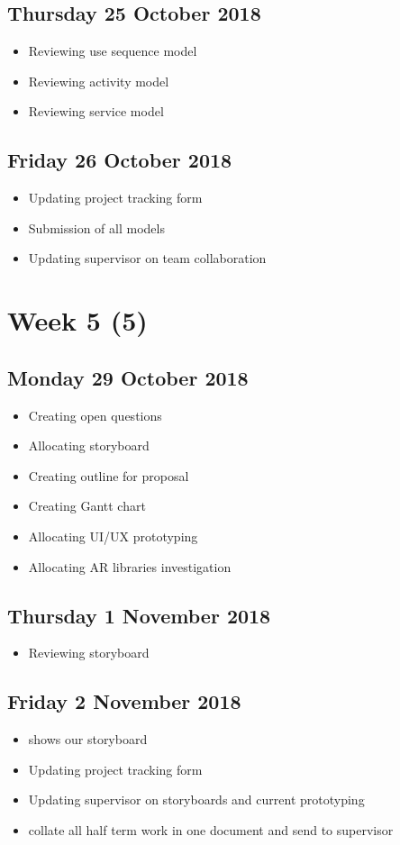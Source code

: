 \subsection*{Thursday 25 October 2018}
\begin{itemize}
	\item Reviewing use sequence model
	\item Reviewing activity model
	\item Reviewing service model 
\end{itemize}

\subsection*{Friday 26 October 2018}
\begin{itemize}
    \item Updating project tracking form
	\item Submission of all models
	\item Updating supervisor on team collaboration
\end{itemize}

\section*{Week 5 (5)}
\subsection*{Monday 29 October 2018}
\begin{itemize}
    \item Creating open questions
	\item Allocating storyboard
	\item Creating outline for proposal
	\item Creating Gantt chart
	\item Allocating UI/UX prototyping
	\item Allocating AR libraries investigation
\end{itemize}

\subsection*{Thursday 1 November 2018}
\begin{itemize}
	\item Reviewing storyboard
\end{itemize}

\subsection*{Friday 2 November 2018}
\begin{itemize}
    \item shows our storyboard
    \item Updating project tracking form
	\item Updating supervisor on storyboards and current prototyping
	\item collate all half term work in one document and send to supervisor
\end{itemize}

